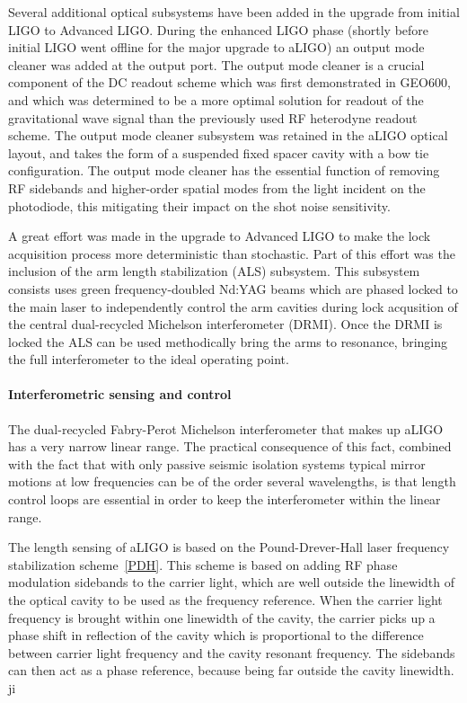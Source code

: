 Several additional optical subsystems have been added in the upgrade from initial LIGO to Advanced LIGO. 
During the enhanced LIGO phase (shortly before initial LIGO went offline for the major upgrade to aLIGO) an output
mode cleaner was added at the output port. The output mode cleaner is a crucial component of the DC readout 
scheme which was first demonstrated in GEO600, and which was determined to be a more optimal solution for 
readout of the gravitational wave signal than the previously used RF heterodyne readout scheme. The output mode 
cleaner subsystem was retained in the aLIGO optical layout, and takes the form of a suspended fixed spacer cavity 
with a bow tie configuration. The output mode cleaner has the essential function of removing RF sidebands and higher-order 
spatial modes from the light incident on the photodiode, this mitigating their impact on the shot noise sensitivity. 

A great effort was made in the upgrade to Advanced LIGO to make the lock acquisition process more deterministic than 
stochastic. Part of this effort was the inclusion of the arm length stabilization (ALS) subsystem. This subsystem consists uses 
green frequency-doubled Nd:YAG beams which are phased locked to the main laser to independently control the arm cavities during 
lock acqusition of the central dual-recycled Michelson interferometer (DRMI). Once the DRMI is locked the ALS can be used 
methodically bring the arms to resonance, bringing the full interferometer to the ideal operating point.

\paragraph*{Interferometric sensing and control}
The dual-recycled Fabry-Perot Michelson interferometer that makes up aLIGO has a very narrow linear range. 
The practical consequence of this fact, combined with the fact that with only passive seismic isolation systems typical 
mirror motions at low frequencies can be of the order several wavelengths, is that length control loops are essential in order 
to keep the interferometer within the linear range. 

The length sensing of aLIGO is based on the Pound-Drever-Hall laser frequency stabilization scheme~\ref{PDH}. 
This scheme is based on adding RF phase modulation sidebands to the carrier light, which are well outside the linewidth 
of the optical cavity 
to be used as the frequency reference. When the carrier light frequency is brought within one linewidth of the cavity, 
the carrier picks up a phase shift in reflection of the cavity which is proportional to the difference between carrier light 
frequency and the cavity resonant frequency. The sidebands can then act as a phase reference, because being far outside 
the cavity linewidth. ji


